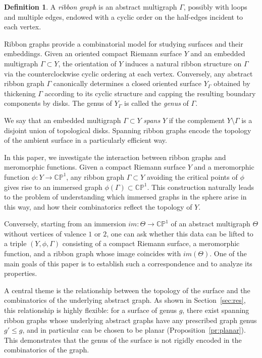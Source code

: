 \documentclass[reqno]{amsart}
\theoremstyle{definition}
\newtheorem{definition}[theorem]{Definition}
\begin{document}
\begin{definition}
A \emph{ribbon graph} is an abstract multigraph $\Gamma$, possibly with loops and multiple edges, endowed with a cyclic order on the half-edges incident to each vertex.
\end{definition}

Ribbon graphs provide a combinatorial model for studying surfaces and their embeddings. Given an oriented compact Riemann surface $Y$ and an embedded multigraph $\Gamma \subset Y$, the orientation of $Y$ induces a natural ribbon structure on $\Gamma$ via the counterclockwise cyclic ordering at each vertex. Conversely, any abstract ribbon graph $\Gamma$ canonically determines a closed oriented surface $Y_\Gamma$ obtained by thickening $\Gamma$ according to its cyclic structure and capping the resulting boundary components by disks. The genus of $Y_\Gamma$ is called the \emph{genus} of $\Gamma$.

We say that an embedded multigraph $\Gamma \subset Y$ \emph{spans} $Y$ if the complement $Y \setminus \Gamma$ is a disjoint union of topological disks. Spanning ribbon graphs encode the topology of the ambient surface in a particularly efficient way.

In this paper, we investigate the interaction between ribbon graphs and meromorphic functions. Given a compact Riemann surface $Y$ and a meromorphic function $\phi : Y \to \mathbb{CP}^1$, any ribbon graph $\Gamma \subset Y$ avoiding the critical points of $\phi$ gives rise to an immersed graph $\phi(\Gamma) \subset \mathbb{CP}^1$. This construction naturally leads to the problem of understanding which immersed graphs in the sphere arise in this way, and how their combinatorics reflect the topology of $Y$.

Conversely, starting from an immersion $im:\Theta \to \mathbb{CP}^1$ of an abstract multigraph $\Theta$ without vertices of valence $1$ or $2$, one can ask whether this data can be lifted to a triple $(Y, \phi, \Gamma)$ consisting of a compact Riemann surface, a meromorphic function, and a ribbon graph whose image coincides with $im(\Theta)$. One of the main goals of this paper is to establish such a correspondence and to analyze its properties.

A central theme is the relationship between the topology of the surface and the combinatorics of the underlying abstract graph. As shown in Section~\ref{sec:res}, this relationship is highly flexible: for a surface of genus $g$, there exist spanning ribbon graphs whose underlying abstract graphs have any prescribed graph genus $g' \leq g$, and in particular can be chosen to be planar (Proposition~\ref{pr:planar}). This demonstrates that the genus of the surface is not rigidly encoded in the combinatorics of the graph.
\end{document}
